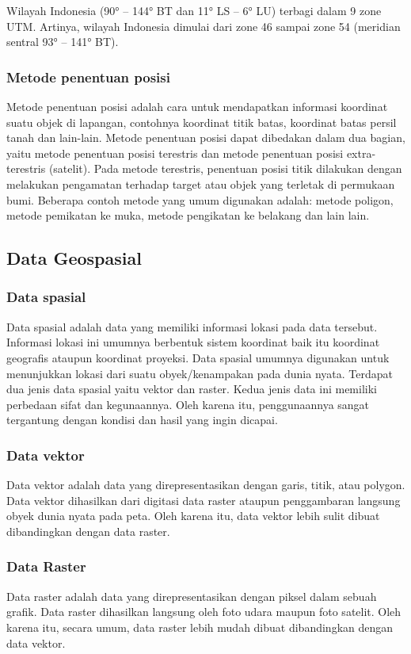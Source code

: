   Wilayah Indonesia (90° – 144° BT dan 11° LS – 6° LU) terbagi dalam 9 zone UTM. Artinya, wilayah Indonesia dimulai dari zone 46 sampai zone 54 (meridian sentral 93° – 141° BT).
\subsubsection{Metode penentuan posisi}
Metode penentuan posisi adalah cara untuk mendapatkan informasi koordinat suatu objek di lapangan, contohnya koordinat titik batas, koordinat batas persil tanah dan lain-lain. Metode penentuan posisi dapat dibedakan dalam dua bagian, yaitu metode penentuan posisi terestris dan metode penentuan posisi extra-terestris (satelit).
Pada metode terestris, penentuan posisi titik dilakukan dengan melakukan pengamatan terhadap target atau objek yang terletak di permukaan bumi. Beberapa contoh metode yang umum digunakan adalah:
metode poligon, metode pemikatan ke muka, metode pengikatan ke belakang dan lain lain.
\subsection{Data Geospasial}
\subsubsection{Data spasial}
Data spasial adalah data yang memiliki informasi lokasi pada data tersebut. Informasi lokasi ini umumnya berbentuk sistem koordinat baik itu koordinat geografis ataupun koordinat proyeksi.
Data spasial umumnya digunakan untuk menunjukkan lokasi dari suatu obyek/kenampakan pada dunia nyata.
Terdapat dua jenis data spasial yaitu vektor dan raster. Kedua jenis data ini memiliki perbedaan sifat dan kegunaannya. Oleh karena itu, penggunaannya sangat tergantung dengan kondisi dan hasil yang ingin dicapai.
\subsubsection{Data vektor}
Data vektor adalah data yang direpresentasikan dengan garis, titik, atau polygon. Data vektor dihasilkan dari digitasi data raster ataupun penggambaran langsung obyek dunia nyata pada peta. Oleh karena itu, data vektor lebih sulit dibuat dibandingkan dengan data raster.
\subsubsection{Data Raster}
Data raster adalah data yang direpresentasikan dengan piksel dalam sebuah grafik. Data raster dihasilkan langsung oleh foto udara maupun foto satelit. Oleh karena itu, secara umum, data raster lebih mudah dibuat dibandingkan dengan data vektor.
